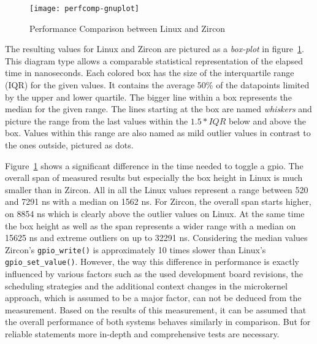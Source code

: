 \begin{figure} [t]
    \centering
    \texttt{[image: perfcomp-gnuplot]}
    \caption{Performance Comparison between Linux and Zircon}\label{pic:perftest}
\end{figure}

The resulting values for Linux and Zircon are pictured as a \textit{box-plot} in figure~\ref{pic:perftest}.
This diagram type allows a comparable statistical representation of the elapsed time in nanoseconds.
Each colored box has the size of the interquartile range (IQR) for the given values.
It contains the average 50\% of the datapoints limited by the upper and lower quartile.
The bigger line within a box represents the median for the given range.
The lines starting at the box are named \textit{whiskers} and picture the range from the last values within the $1.5 * IQR$ below and above the box.
Values within this range are also named as mild outlier values in contrast to the ones outside, pictured as dots. 

Figure~\ref{pic:perftest} shows a significant difference in the time needed to toggle a \ac{gpio}.
The overall span of measured results but especially the box height in Linux is much smaller than in Zircon.
All in all the Linux values represent a range between 520 and 7291 ns with a median on 1562 ns.
For Zircon, the overall span starts higher, on 8854 ns which is clearly above the outlier values on Linux.
At the same time the box height as well as the span represents a wider range with a median on 15625 ns and extreme outliers on up to 32291 ns.
Considering the median values Zircon's \texttt{gpio_write()} is approximately 10 times slower than Linux's \texttt{gpio_set_value()}.
However, the way this difference in performance is exactly influenced by various factors such as the used development board revisions, the scheduling strategies and the additional context changes in the microkernel approach, which is assumed to be a major factor, can not be deduced from the measurement.
Based on the results of this measurement, it can be assumed that the overall performance of both systems behaves similarly in comparison.
But for reliable statements more in-depth and comprehensive tests are necessary.


